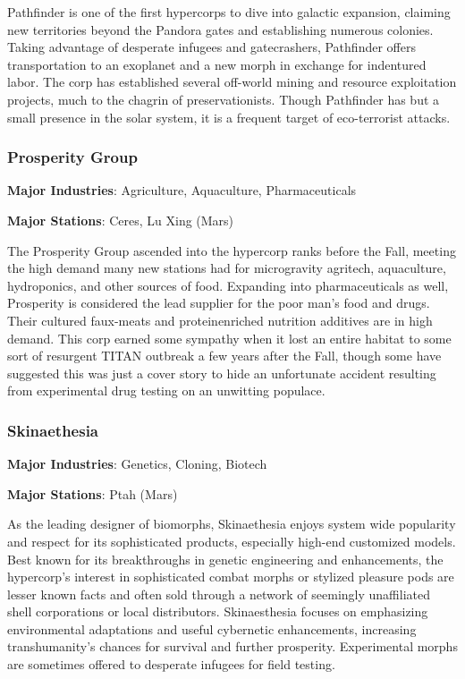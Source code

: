Pathfinder is one of the first hypercorps to dive into galactic
expansion, claiming new territories beyond the Pandora gates and
establishing numerous colonies.  Taking advantage of desperate
infugees and gatecrashers, Pathfinder offers transportation to an
exoplanet and a new morph in exchange for indentured labor.  The corp
has established several off-world mining and resource exploitation
projects, much to the chagrin of preservationists. Though Pathfinder
has but a small presence in the solar system, it is a frequent target
of eco-terrorist attacks.

\subsubsection{Prosperity Group}
\label{sec:prosperity-group}

\textbf{Major Industries}: Agriculture, Aquaculture, Pharmaceuticals

\textbf{Major Stations}: Ceres, Lu Xing (Mars)


The Prosperity Group ascended into the hypercorp ranks before the
Fall, meeting the high demand many new stations had for microgravity
agritech, aquaculture, hydroponics, and other sources of food.
Expanding into pharmaceuticals as well, Prosperity is considered the
lead supplier for the poor man's food and drugs. Their cultured
faux-meats and proteinenriched nutrition additives are in high
demand. This corp earned some sympathy when it lost an entire habitat
to some sort of resurgent TITAN outbreak a few years after the Fall,
though some have suggested this was just a cover story to hide an
unfortunate accident resulting from experimental drug testing on an
unwitting populace.

\subsubsection{Skinaethesia}
\label{sec:skinaethesia}

\textbf{Major Industries}: Genetics, Cloning, Biotech

\textbf{Major Stations}: Ptah (Mars)


As the leading designer of biomorphs, Skinaethesia enjoys system wide
popularity and respect for its sophisticated products, especially
high-end customized models. Best known for its breakthroughs in
genetic engineering and enhancements, the hypercorp's interest in
sophisticated combat morphs or stylized pleasure pods are lesser known
facts and often sold through a network of seemingly unaffiliated shell
corporations or local distributors. Skinaesthesia focuses on
emphasizing environmental adaptations and useful cybernetic
enhancements, increasing transhumanity's chances for survival and
further prosperity. Experimental morphs are sometimes offered to
desperate infugees for field testing.

